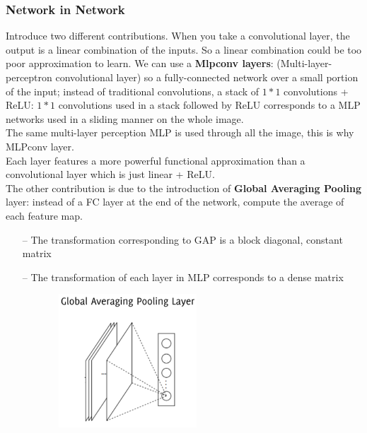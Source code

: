 \subsubsection{Network in Network}
Introduce two different contributions. When you take a convolutional layer, the output is a linear combination of the inputs. So a linear combination could be too poor approximation to learn. We can use a \textbf{Mlpconv layers}: (Multi-layer-perceptron convolutional layer)
so a fully-connected network over a small portion of the input; 
instead of traditional convolutions, a stack of $1*1$ convolutions + ReLU: $1*1$ convolutions used in a stack followed by ReLU corresponds to a MLP networks used in a sliding manner on the whole image. \\
The same multi-layer perception MLP is used through all the image, this is why MLPconv layer. \\
Each layer features a more powerful functional approximation than a convolutional layer which is just linear + ReLU. \\ 

The other contribution is due to the introduction of \textbf{Global Averaging Pooling} layer: instead of a FC layer at the end of the network, compute the average of each feature map.
\begin{itemize}
    \item[--] The transformation corresponding to GAP is a block diagonal, constant matrix
    \item[--] The transformation of each layer in MLP corresponds to a dense matrix
\end{itemize}{}


\begin{figure}
    \includegraphics[width=7cm, height=5cm]{images/gap.png}
\end{figure}  

